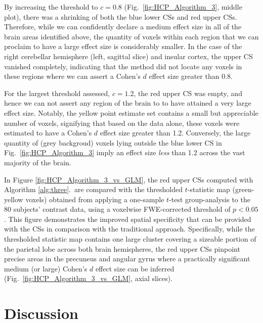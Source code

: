 By increasing the threshold to $c = 0.8$ (Fig.\ \ref{fig:HCP_Algorithm_3}, middle plot), there was a shrinking of both the blue lower CSs and red upper CSs. Therefore, while we can confidently declare a medium effect size in all of the brain areas identified above, the quantity of voxels within each region that we can proclaim to have a large effect size is considerably smaller. In the case of the right cerebellar hemisphere (left, sagittal slice) and insular cortex, the upper CS vanished completely, indicating that the method did not locate any voxels in these regions where we can assert a Cohen's $d$ effect size greater than 0.8.

For the largest threshold assessed, $c = 1.2$, the red upper CS was empty, and hence we can not assert any region of the brain to to have attained a very large effect size. Notably, the yellow point estimate set contains a small but appreciable number of voxels, signifying that based on the data alone, these voxels were estimated to have a Cohen's $d$ effect size greater than 1.2. Conversely, the large quantity of (grey backgroud) voxels lying outside the blue lower CS in Fig.\ \ref{fig:HCP_Algorithm_3} imply an effect size \textit{less} than 1.2 across the vast majority of the brain.

In Figure \ref{fig:HCP_Algorithm_3_vs_GLM}, the red upper CSs computed with Algorithm \ref{alg:three}.\ are compared with the thresholded $t$-statistic map (green-yellow voxels) obtained from applying a one-sample $t$-test group-analysis to the 80 subjects' contrast data, using a voxelwise FWE-corrected threshold of $p < 0.05$. This figure demonstrates the improved spatial specificity that can be provided with the CSs in comparison with the traditional approach. Specifically, while the thresholded statistic map contains one large cluster covering a sizeable portion of the parietal lobe across both brain hemispheres, the red upper CSs pinpoint precise areas in the precuneus and angular gyrus where a practically significant medium (or large) Cohen's $d$ effect size can be inferred (Fig.\ \ref{fig:HCP_Algorithm_3_vs_GLM}, axial slices).

\section{Discussion}
